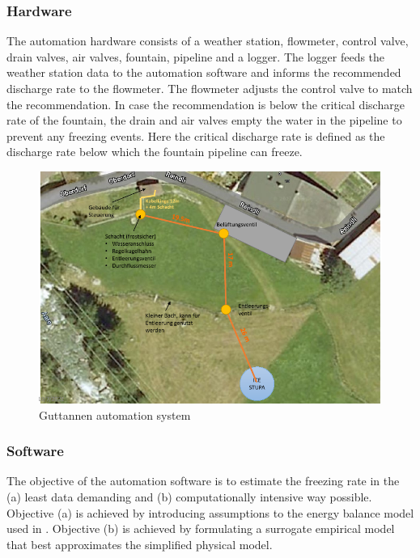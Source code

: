 \documentclass[utf8]{frontiersSCNS}
\begin{document}
\subsubsection{Hardware}
The automation hardware consists of a weather station, flowmeter, control valve, drain valves, air valves,
fountain, pipeline and a logger. The logger feeds the weather station data to the automation software and
informs the recommended discharge rate to the flowmeter. The flowmeter adjusts the control valve to match the
recommendation. In case the recommendation is below the critical discharge rate of the fountain, the drain and
air valves empty the water in the pipeline to prevent any freezing events. Here the critical discharge rate is
defined as the discharge rate below which the fountain pipeline can freeze.

\begin{figure}[ht]
	\begin{center}
		\includegraphics[width=\linewidth]{Figures/automation_system.png}
	\end{center}
  \caption{Guttannen automation system}
	\label{fig:layout}
\end{figure}

\subsubsection{Software}

The objective of the automation software is to estimate the freezing rate in the (a) least data demanding and
(b) computationally intensive way possible. Objective (a) is achieved by introducing assumptions to the energy
balance model used in \cite{balasubramanianInfluenceMeteorologicalConditions2022}. Objective (b) is achieved by formulating a surrogate empirical
model that best approximates the simplified physical model. 
\end{document}
